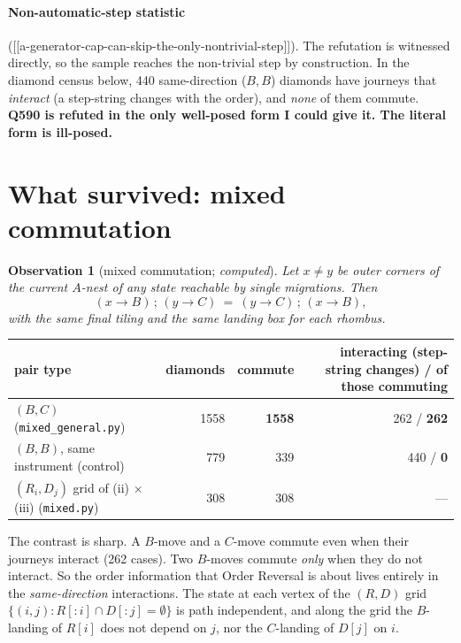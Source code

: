 \documentclass[11pt]{article}
\newtheorem{observation}[theorem]{Observation}
\theoremstyle{definition}
\begin{document}
\paragraph{Non-automatic-step statistic} ([[a-generator-cap-can-skip-the-only-nontrivial-step]]). The refutation is witnessed
directly, so the sample reaches the non-trivial step by construction. In the diamond census below, 440 same-direction ($B,B$)
diamonds have journeys that \emph{interact} (a step-string changes with the order), and \emph{none} of them commute.
\textbf{Q590 is refuted in the only well-posed form I could give it. The literal form is ill-posed.}

\section{What survived: mixed commutation}
\begin{observation}[mixed commutation; \emph{computed}]\label{obs:mixed}
Let $x\neq y$ be outer corners of the current $A$-nest of any state reachable by single migrations. Then
\[
(x\to B)\,;\,(y\to C)\ =\ (y\to C)\,;\,(x\to B),
\]
with the same final tiling and the same landing box for each rhombus.
\end{observation}
\begin{center}\begin{tabular}{lrrr}\toprule
pair type & diamonds & commute & interacting (step-string changes) / of those commuting\\\midrule
$(B,C)$ (\texttt{mixed\_general.py}) & 1558 & \textbf{1558} & 262 / \textbf{262}\\
$(B,B)$, same instrument (control) & 779 & 339 & 440 / \textbf{0}\\
$(R_i,D_j)$ grid of (ii) $\times$ (iii) (\texttt{mixed.py}) & 308 & 308 & ---\\\bottomrule
\end{tabular}\end{center}
The contrast is sharp. A $B$-move and a $C$-move commute even when their journeys interact (262 cases). Two $B$-moves commute
\emph{only} when they do not interact. So the order information that Order Reversal is about lives entirely in the
\emph{same-direction} interactions. The state at each vertex of the $(R,D)$ grid
$\{(i,j): R[{:}i]\cap D[{:}j]=\emptyset\}$ is path independent, and along the grid the $B$-landing of $R[i]$ does not depend
on $j$, nor the $C$-landing of $D[j]$ on $i$.
\end{document}
